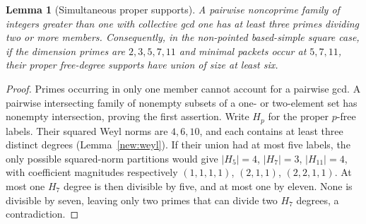 \documentclass[11pt]{amsart}
\numberwithin{equation}{section}
\newtheorem{lemma}[theorem]{Lemma}
\theoremstyle{definition}
\theoremstyle{plain}
\begin{document}
\begin{lemma}[Simultaneous proper supports]\label{new:proper-support-union}
A pairwise noncoprime family of integers greater than one with
collective gcd one has at least three primes dividing two or more
members. Consequently, in the non-pointed based-simple square case,
if the dimension primes are $2,3,5,7,11$ and minimal packets occur
at $5,7,11$, their proper free-degree supports have union of size
at least six.
\end{lemma}
\begin{proof}
Primes occurring in only one member cannot account for a pairwise
gcd. A pairwise intersecting family of nonempty subsets of a
one- or two-element set has nonempty intersection, proving the
first assertion. Write $H_p$ for the proper $p$-free labels.
Their squared Weyl norms are $4,6,10$, and each contains at least
three distinct degrees (Lemma~\ref{new:weyl}). If their union had
at most five labels, the only possible squared-norm partitions
would give $|H_5|=4$, $|H_7|=3$, $|H_{11}|=4$, with coefficient
magnitudes respectively $(1,1,1,1)$, $(2,1,1)$, $(2,2,1,1)$.
At most one $H_7$ degree is then divisible by five, and at most one
by eleven. None is divisible by seven, leaving only two primes
that can divide two $H_7$ degrees, a contradiction.
\end{proof}
\end{document}
